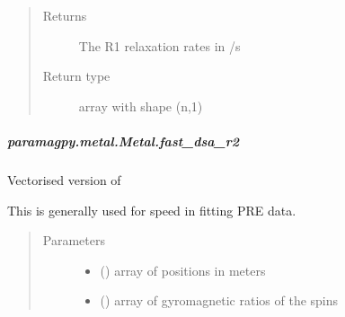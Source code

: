 \documentclass[a4paper,10pt,english,openany,oneside]{sphinxmanual}
\begin{document}
\begin{fulllineitems}
\begin{fulllineitems}
\begin{fulllineitems}
\begin{quote}
\begin{description}
\begin{itemize}
\end{itemize}

\item[{Returns}] \leavevmode
{} \textendash{} The R1 relaxation rates in /s

\item[{Return type}] \leavevmode
array with shape (n,1)

\end{description}\end{quote}

\end{fulllineitems}



\subparagraph{paramagpy.metal.Metal.fast\_dsa\_r2}
\label{\detokenize{reference/generated/paramagpy.metal.Metal.fast_dsa_r2:paramagpy-metal-metal-fast-dsa-r2}}\label{\detokenize{reference/generated/paramagpy.metal.Metal.fast_dsa_r2::doc}}

\begin{fulllineitems}
\label{\detokenize{reference/generated/paramagpy.metal.Metal.fast_dsa_r2:paramagpy.metal.Metal.fast_dsa_r2}}
Vectorised version of {\hyperref[\detokenize{reference/generated/paramagpy.metal.Metal.dsa_r2:paramagpy.metal.Metal.dsa_r2}]{}}

This is generally used for speed in fitting PRE data.
\begin{quote}\begin{description}
\item[{Parameters}] \leavevmode\begin{itemize}
\item {} 
 (\sphinxstyleliteralemphasis{\sphinxupquote{ (}}\sphinxstyleliteralemphasis{\sphinxupquote{,}}\sphinxstyleliteralemphasis{\sphinxupquote{)}}) \textendash{} array of positions in meters

\item {} 
 (\sphinxstyleliteralemphasis{\sphinxupquote{ (}}\sphinxstyleliteralemphasis{\sphinxupquote{,}}\sphinxstyleliteralemphasis{\sphinxupquote{)}}) \textendash{} array of gyromagnetic ratios of the spins


\end{itemize}
\end{description}
\end{quote}
\end{fulllineitems}
\end{fulllineitems}
\end{fulllineitems}
\end{document}
